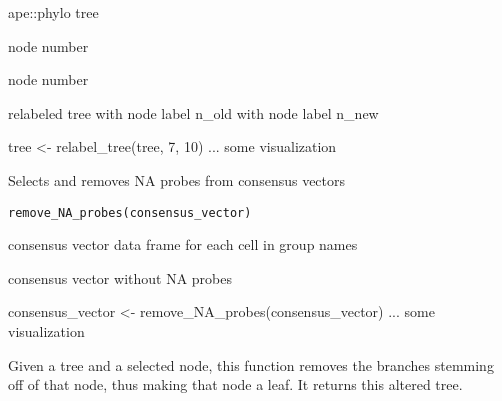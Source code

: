 \documentclass[a4paper]{book}
\begin{document}
%
\begin{Arguments}
\begin{ldescription}
\item[\code{tree}] ape::phylo tree

\item[\code{n\_old}] node number

\item[\code{n\_new}] node number
\end{ldescription}
\end{Arguments}
%
\begin{Value}
relabeled tree with node label n\_old with node label
n\_new
\end{Value}
%
\begin{Examples}
\begin{ExampleCode}
tree <- relabel_tree(tree, 7, 10)
... some visualization 
\end{ExampleCode}
\end{Examples}
%
\begin{Description}\relax
Selects and removes NA probes from consensus vectors
\end{Description}
%
\begin{Usage}
\begin{verbatim}
remove_NA_probes(consensus_vector)
\end{verbatim}
\end{Usage}
%
\begin{Arguments}
\begin{ldescription}
\item[\code{consensus\_vector}] consensus vector data frame for each cell in group 
names
\end{ldescription}
\end{Arguments}
%
\begin{Value}
consensus vector without NA probes
\end{Value}
%
\begin{Examples}
\begin{ExampleCode}
consensus_vector <- remove_NA_probes(consensus_vector)
... some visualization 
\end{ExampleCode}
\end{Examples}
%
\begin{Description}\relax
Given a tree and a selected node, this function removes the branches 
stemming off of that node, thus making that node a leaf. It returns this 
altered tree.
\end{Description}
\end{document}
